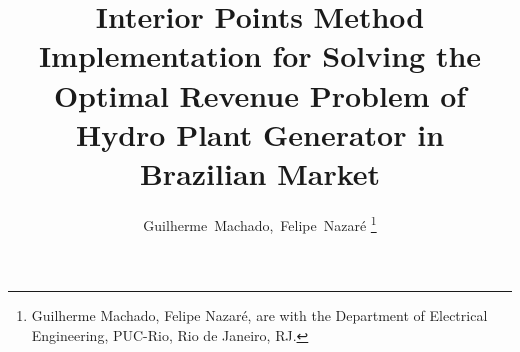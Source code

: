 \documentclass[a4paper]{IEEEtran}
\begin{document}
%
\title{Interior Points Method Implementation for Solving the Optimal Revenue Problem of Hydro Plant Generator in Brazilian Market}
%
%
%

\author{Guilherme~Machado,~Felipe~Nazaré%
\thanks{Guilherme Machado, Felipe Nazaré, are with the Department of Electrical Engineering, PUC-Rio, Rio de Janeiro, RJ.}%
}

% 
%



% 
\end{document}
